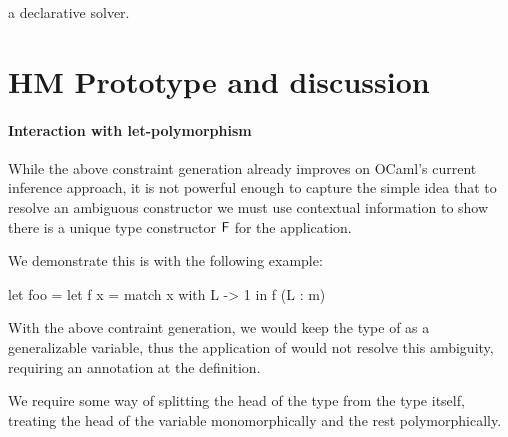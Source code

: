 \documentclass[acmsmall,screen,nonacm]{acmart}
\begin{document}
\TODO
{a declarative solver.}












\section{HM Prototype and discussion}
\label{sec:implementation}





\paragraph{Interaction with let-polymorphism}


While the above constraint generation already improves on
OCaml's current inference approach, it is not powerful enough to capture the
simple idea that to resolve an ambiguous constructor we must use contextual
information to show there is a unique type constructor $\mathsf{F}$ for the
application.

We demonstrate this is with the following example:
\begin{program}
let foo =
  let f x = match x with L -> 1 in
  f (L : m)
\end{program}
With the above contraint generation, we would keep the type of 
as a generalizable variable, thus the application of  would not
resolve this ambiguity, requiring an annotation at the definition.

We require some way of splitting the head of the type from the type itself,
treating the head of the variable monomorphically and the rest
polymorphically.
\end{document}
